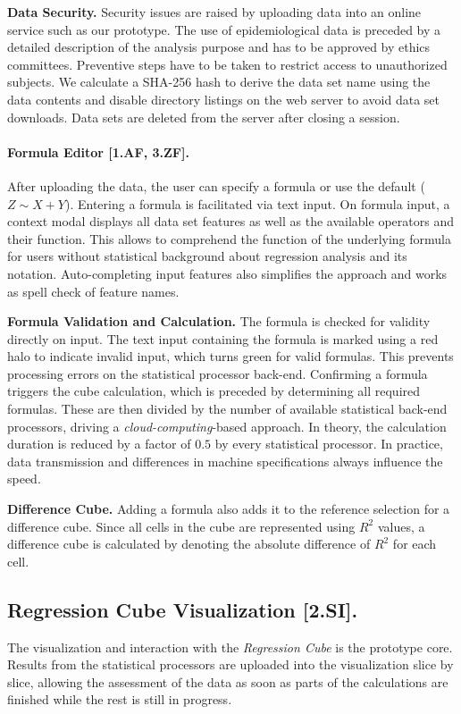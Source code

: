\documentclass[journal]{style/vgtc} 			          %
\begin{document}
\textbf{Data Security.}
Security issues are raised by uploading data into an online service such as our prototype.
The use of epidemiological data is preceded by a detailed description of the analysis purpose and has to be approved by ethics committees.
Preventive steps have to be taken to restrict access to unauthorized subjects.
We calculate a SHA-256 hash to derive the data set name using the data contents and disable directory listings on the web server to avoid data set downloads.
Data sets are deleted from the server after closing a session.

\paragraph{Formula Editor [1.AF, 3.ZF].}
After uploading the data, the user can specify a formula or use the default ($Z \sim X + Y$).
Entering a formula is facilitated via text input.
On formula input, a context modal displays all data set features as well as the available operators and their function.
This allows to comprehend the function of the underlying formula for users without statistical background about regression analysis and its notation.
Auto-completing input features also simplifies the approach and works as spell check of feature names.

\textbf{Formula Validation and Calculation.} The formula is checked for validity directly on input.
The text input containing the formula is marked using a red halo to indicate invalid input, which turns green for valid formulas.
This prevents processing errors on the statistical processor back-end.
Confirming a formula triggers the cube calculation, which is preceded by determining all required formulas.
These are then divided by the number of available statistical back-end processors, driving a \emph{cloud-computing}-based approach.
In theory, the calculation duration is reduced by a factor of $0.5$ by every statistical processor.
In practice, data transmission and differences in machine specifications always influence the speed.

\textbf{Difference Cube.}
Adding a formula also adds it to the reference selection for a difference cube.
Since all cells in the cube are represented using $R^2$ values, a difference cube is calculated by denoting the absolute difference of $R^2$ for each cell.
\subsection{Regression Cube Visualization [2.SI].}
The visualization and interaction with the \emph{Regression Cube} is the prototype core.
Results from the statistical processors are uploaded into the visualization slice by slice, allowing the assessment of the data as soon as parts of the calculations are finished while the rest is still in progress.
\end{document}
